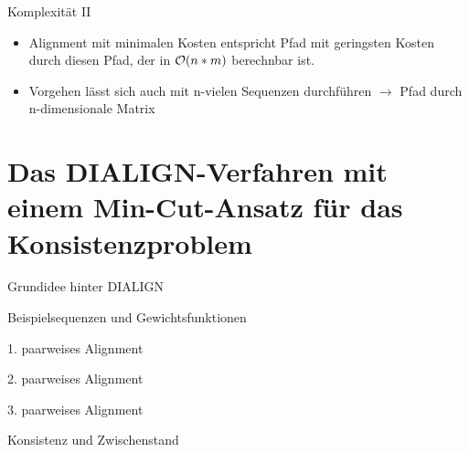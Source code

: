 \documentclass[wide,xcolor={x11names},hyperref={colorlinks=false},pantone312]{beamer}
\begin{document}
\begin{frame}[t, fragile]{Komplexität II}
	\footnotesize
	\normalsize
	\begin{itemize}			
		\item Alignment mit minimalen Kosten entspricht Pfad mit geringsten Kosten durch diesen Pfad, der in $\mathcal{O}(n*m)$ berechnbar ist.
		\item Vorgehen lässt sich auch mit n-vielen Sequenzen durchführen $\rightarrow$ Pfad durch n-dimensionale Matrix 
	\end{itemize}
\end{frame}

\section{Das DIALIGN-Verfahren mit einem Min-Cut-Ansatz für das Konsistenzproblem}

\begin{frame}[t]{Grundidee hinter DIALIGN}
\end{frame}

\begin{frame}[t]{Beispielsequenzen und Gewichtsfunktionen}
\end{frame}

\begin{frame}[t]{1. paarweises Alignment}
\end{frame}

\begin{frame}[t]{2. paarweises Alignment}
\end{frame}

\begin{frame}[t]{3. paarweises Alignment}
\end{frame}

\begin{frame}[t]{Konsistenz und Zwischenstand}
\end{frame}
\end{document}
